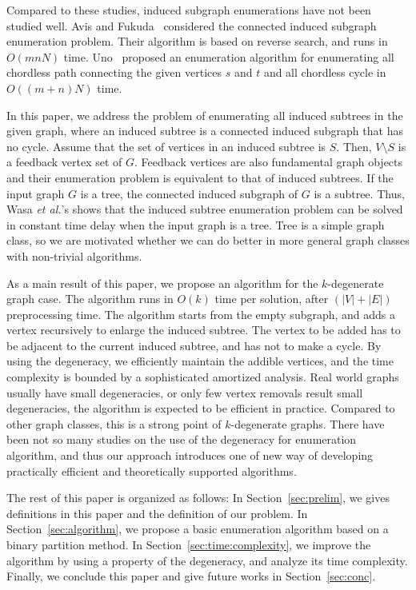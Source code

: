 \documentclass{llncs}
\begin{document}
Compared to these studies, 
induced subgraph enumerations have not been studied well.
Avis and Fukuda~\cite{Avis:Fukuda:DAM:1996} considered 
the connected induced subgraph enumeration problem. 
Their algorithm is based on reverse search, 
and runs in $O(mnN)$ time.
Uno~\cite{Uno:SIGAL:2003} proposed 
an enumeration algorithm for enumerating all chordless path 
connecting the given vertices $s$ and $t$ 
and all chordless cycle in $O((m+n)N)$ time. 

In this paper, 
we address the problem of enumerating all induced subtrees
in the given graph, 
where an induced subtree is a connected induced subgraph that has no cycle. 
Assume that the set of vertices in an induced subtree is $S$. 
Then, $V \setminus S$ is a feedback vertex set of $G$. 
Feedback vertices are also 
fundamental graph objects and their enumeration problem is 
equivalent to that of induced subtrees. 
If the input graph $G$ is a tree, 
the connected induced subgraph of $G$ is a subtree. 
Thus, 
Wasa \textit{et al.}'s shows that 
the induced subtree enumeration problem can be solved in constant time delay 
when the input graph is a tree. 
Tree is a simple graph class, 
so we are motivated whether we can do better
in more general graph classes with non-trivial algorithms.


As a main result of this paper, 
we propose an algorithm for the $k$-degenerate graph case. 
The algorithm runs in $O(k)$ time per solution, 
after $(|V|+|E|)$ preprocessing time. 
The algorithm starts from the empty subgraph,
and adds a vertex recursively to enlarge the induced subtree.
The vertex to be added has to be adjacent to the current induced subtree, 
and has not to make a cycle. 
By using the degeneracy, 
we efficiently maintain the addible vertices, 
and the time complexity is bounded by a sophisticated amortized analysis.
Real world graphs usually have small degeneracies, 
or only few vertex removals result small degeneracies, 
the algorithm is expected to be efficient in practice. 
Compared to other graph classes, 
this is a strong point of $k$-degenerate graphs. 
There have been not so many studies on the use of the degeneracy for enumeration algorithm, 
and thus our approach introduces 
one of new way of developing practically efficient 
and theoretically supported algorithms.


The rest of this paper is organized as follows: 
In Section~\ref{sec:prelim}, 
we gives definitions in this paper 
and the definition of our problem. 
In Section~\ref{sec:algorithm}, 
we propose a basic enumeration algorithm based on a binary partition method. 
In Section~\ref{sec:time:complexity}, 
we improve the algorithm by using a property of the degeneracy, 
and analyze its time complexity. 
Finally, we conclude this paper and give future works in Section~\ref{sec:conc}. 
\end{document}
